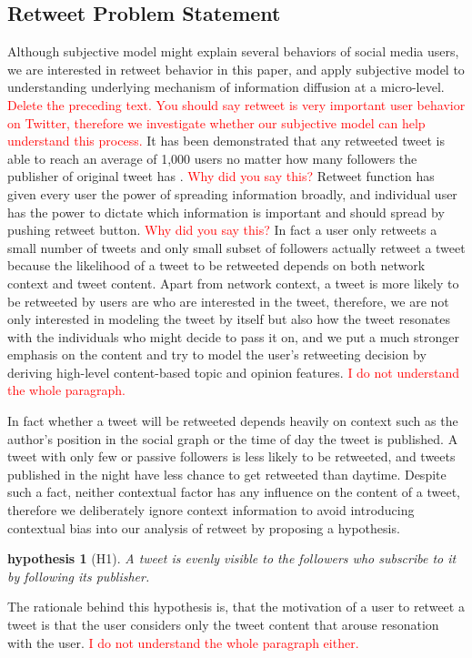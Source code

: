 \documentclass{acm_proc_article-sp}
\newtheorem{hypothesis}{hypothesis}
\newcommand{\mo}[1]{\textcolor{red}{#1}}
\begin{document}
\subsection{Retweet Problem Statement}
\label{statement}
Although subjective model might explain several behaviors of social media users, we are interested in retweet behavior in this paper, and apply subjective model to understanding underlying mechanism of information diffusion at a micro-level. \mo{Delete the preceding text. You should say retweet is very important user behavior on Twitter, therefore we investigate whether our subjective model can help understand this process.} 
It has been demonstrated that any retweeted tweet is able to reach an average of 1,000 users no matter how many followers the publisher of original tweet has \cite{Kwak:2010TSN}. \mo{Why did you say this?} 
Retweet function has given every user the power of spreading information broadly, and individual user has the power to dictate which information is important and should spread by pushing retweet button. \mo{Why did you say this?} 
In fact a user only retweets a small number of tweets and only small subset of followers actually retweet a tweet because the likelihood of a tweet to be retweeted depends on both network context and tweet content. 
Apart from network context, a tweet is more likely to be retweeted by users are who are interested in the tweet, therefore, we are not only interested in modeling the tweet by itself but also how the tweet resonates with the individuals who might decide to pass it on, and we put a much stronger emphasis on the content and try to model the user's retweeting decision by deriving high-level content-based topic and opinion features. \mo{I do not understand the whole paragraph.} 

In fact whether a tweet will be retweeted depends heavily on context such as the author's position in the social graph or the time of day the tweet is published. 
A tweet with only few or passive followers is less likely to be retweeted, and tweets published in the night have less chance to get retweeted than daytime. 
Despite such a fact, neither contextual factor has any influence on the content of a tweet, therefore we deliberately ignore context information to avoid introducing contextual bias into our analysis of retweet by proposing a hypothesis. 
\begin{hypothesis}[H1]
\label{hypothesis1}
A tweet is evenly visible to the followers who subscribe to it by following its publisher.
\end{hypothesis}
The rationale behind this hypothesis is, that the motivation of a user to retweet a tweet is that the user considers only the tweet content that arouse resonation with the user. \mo{I do not understand the whole paragraph either.} 
\end{document}
